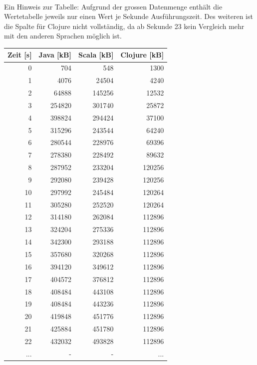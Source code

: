 \documentclass{fancydocument}
\begin{document}
\\
\bigskip
\noindent
Ein Hinweis zur Tabelle: Aufgrund der grossen Datenmenge enthält die Wertetabelle jeweils nur einen Wert je Sekunde Ausführungszeit. Des weiteren ist die Spalte für Clojure nicht vollständig, da ab Sekunde 23 kein Vergleich mehr mit den anderen Sprachen möglich ist.


\begin{center}
\begin{tabular}{|r|r|r|r|} \hline
\textbf{Zeit [s]} & \textbf{Java [kB]} & \textbf{Scala [kB]} & \textbf{Clojure [kB]}\\
\hline
0 & 704 & 548 & 1300\\
\hline
1 & 4076 & 24504 & 4240\\
\hline
2 & 64888 & 145256 & 12532\\
\hline
3 & 254820 & 301740 & 25872\\
\hline
4 & 398824 & 294424 & 37100\\
\hline
5 & 315296 & 243544 & 64240\\
\hline
6 & 280544 & 228976 & 69396\\
\hline
7 & 278380 & 228492 & 89632\\
\hline
8 & 287952 & 233204 & 120256\\
\hline
9 & 292080 & 239428 & 120256\\
\hline
10 & 297992 & 245484 & 120264\\
\hline
11 & 305280 & 252520 & 120264\\
\hline
12 & 314180 & 262084 & 112896\\
\hline
13 & 324204 & 275336 & 112896\\
\hline
14 & 342300 & 293188 & 112896\\
\hline
15 & 357680 & 320268 & 112896\\
\hline
16 & 394120 & 349612 & 112896\\
\hline
17 & 404572 & 376812 & 112896\\
\hline
18 & 408484 & 443108 & 112896\\
\hline
19 & 408484 & 443236 & 112896\\
\hline
20 & 419848 & 451776 & 112896\\
\hline
21 & 425884 & 451780 & 112896\\
\hline
22 & 432032 & 493828 & 112896\\
\hline
... & - & - & ...\\
\hline
\end{tabular}


\end{center}
\end{document}
